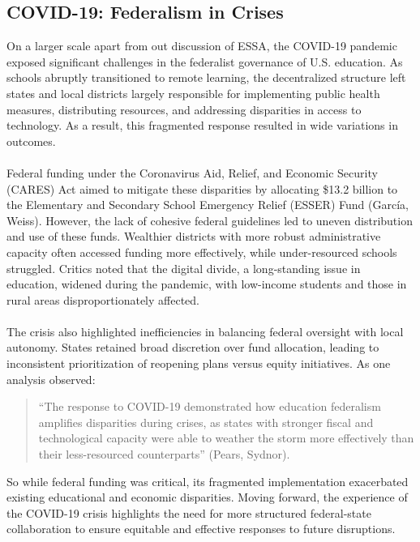 \documentclass[11pt]{extarticle}
\begin{document}
\subsection{COVID-19: Federalism in Crises}
On a larger scale apart from out discussion of ESSA, the COVID-19 pandemic exposed significant challenges in the federalist governance of U.S. education. As schools abruptly transitioned to remote learning, the decentralized structure left states and local districts largely responsible for implementing public health measures, distributing resources, and addressing disparities in access to technology. As a result, this fragmented response resulted in wide variations in outcomes.\\
\\
Federal funding under the Coronavirus Aid, Relief, and Economic Security (CARES) Act aimed to mitigate these disparities by allocating \$13.2 billion to the Elementary and Secondary School Emergency Relief (ESSER) Fund (García, Weiss). However, the lack of cohesive federal guidelines led to uneven distribution and use of these funds. Wealthier districts with more robust administrative capacity often accessed funding more effectively, while under-resourced schools struggled. Critics noted that the digital divide, a long-standing issue in education, widened during the pandemic, with low-income students and those in rural areas disproportionately affected.\\
\\
The crisis also highlighted inefficiencies in balancing federal oversight with local autonomy. States retained broad discretion over fund allocation, leading to inconsistent prioritization of reopening plans versus equity initiatives. As one analysis observed:
\begin{quote}
``The response to COVID-19 demonstrated how education federalism amplifies disparities during crises, as states with stronger fiscal and technological capacity were able to weather the storm more effectively than their less-resourced counterparts” (Pears, Sydnor).
\end{quote}
So while federal funding was critical, its fragmented implementation exacerbated existing educational and economic disparities. Moving forward, the experience of the COVID-19 crisis highlights the need for more structured federal-state collaboration to ensure equitable and effective responses to future disruptions.
\end{document}
